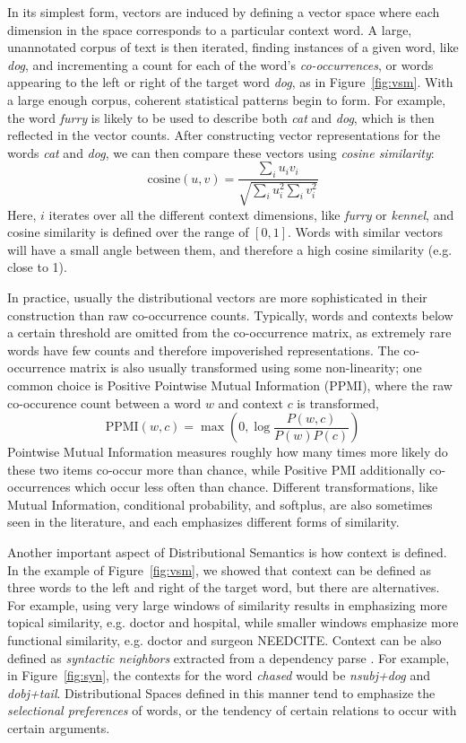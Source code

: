 \documentclass[letterpaper]{article}
\begin{document}
In its simplest form, vectors are induced by defining a vector space where
each dimension in the space corresponds to a particular context word. A large,
unannotated corpus of text is then iterated, finding instances of a given word,
like {\em dog}, and incrementing a count for each of the word's {\em
co-occurrences}, or words appearing to the left or right of the target word
{\em dog}, as in Figure~\ref{fig:vsm}. With a large enough corpus, coherent
statistical patterns begin to form. For example, the word {\em furry} is likely
to be used to describe both {\em cat} and {\em dog}, which is then reflected in
the vector counts. After constructing vector representations for the words {\em
cat} and {\em dog}, we can then compare these vectors using {\em cosine
similarity}:
\begin{equation*}
  \text{cosine}(u, v) = \frac{\sum_i u_iv_i}{\sqrt{\sum_i u_i^2 \sum_i v_i^2}}
\end{equation*}
Here, $i$ iterates over all the different context dimensions, like {\em furry}
or {\em kennel}, and cosine similarity is defined over the range of $[0, 1]$.
Words with similar vectors will have a small angle between them, and therefore
a high cosine similarity (e.g. close to 1).

In practice, usually the distributional vectors are more sophisticated in their
construction than raw co-occurrence counts. Typically, words and contexts below
a certain threshold are omitted from the co-occurrence matrix, as extremely
rare words have few counts and therefore impoverished representations. The
co-occurrence matrix is also usually transformed using some non-linearity;
one common choice is Positive Pointwise Mutual Information (PPMI), where the
raw co-occurence count between a word $w$ and context $c$ is transformed,
\begin{equation*}
  \text{PPMI}(w, c) = \max\left(0, \log\frac{P(w, c)}{P(w)P(c)}\right)
\end{equation*}
Pointwise Mutual Information measures roughly how many times more likely
do these two items co-occur more than chance, while Positive PMI additionally
co-occurrences which occur less often than chance. Different transformations,
like Mutual Information, conditional probability, and softplus, are also
sometimes seen in the literature, and each emphasizes different forms of
similarity.

Another important aspect of Distributional Semantics is how context is defined.
In the example of Figure~\ref{fig:vsm}, we showed that context can be defined
as three words to the left and right of the target word, but there are
alternatives. For example, using very large windows of similarity results in
emphasizing more topical similarity, e.g. doctor and hospital, while smaller
windows emphasize more functional similarity, e.g. doctor and surgeon NEEDCITE.
Context can be also defined as {\em syntactic neighbors} extracted
from a dependency parse \cite{pado:2007:cl}. For example, in Figure~\ref{fig:syn},
the contexts for the word {\em chased} would be {\em nsubj+dog} and {\em
dobj+tail}. Distributional Spaces defined in this manner tend to emphasize
the {\em selectional preferences} of words, or the tendency of certain
relations to occur with certain arguments.
\end{document}

